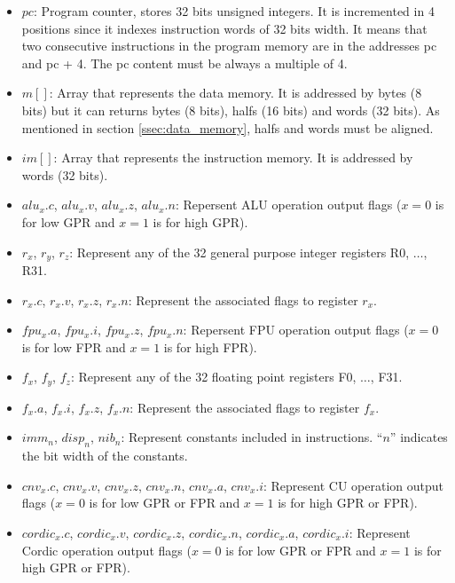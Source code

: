 \begin{itemize}
\item $pc$: Program counter, stores 32 bits unsigned integers. It is incremented in 4 positions since
      it indexes instruction words of 32 bits width. It means that two consecutive instructions in the program memory are in the addresses
      pc and pc + 4. The pc content must be always a multiple of 4.
\item $m[]$: Array that represents the data memory. It is addressed by bytes (8 bits) but it can
      returns bytes (8 bits), halfs (16 bits) and words (32 bits). As mentioned in section \ref{ssec:data_memory}, halfs and words must be
      aligned.
\item $im[]$: Array that represents the instruction memory. It is addressed by words (32 bits).
\item $alu_{x}.c$, $alu_{x}.v$, $alu_{x}.z$, $alu_{x}.n$: Repersent ALU operation output flags ($x=0$ is for low GPR and $x=1$ is for high GPR).
\item $r_{x}$, $r_{y}$, $r_{z}$: Represent any of the 32 general purpose integer registers R0, $\dots$, R31.
\item $r_{x}.c$, $r_{x}.v$, $r_{x}.z$, $r_{x}.n$: Represent the associated flags to register $r_{x}$.
\item $fpu_{x}.a$, $fpu_{x}.i$, $fpu_{x}.z$, $fpu_{x}.n$: Repersent FPU operation output flags ($x=0$ is for low FPR and $x=1$ is for high FPR).
\item $f_{x}$, $f_{y}$, $f_{z}$: Represent any of the 32 floating point registers F0, $\dots$, F31.
\item $f_{x}.a$, $f_{x}.i$, $f_{x}.z$, $f_{x}.n$: Represent the associated flags to register $f_{x}$.
\item $imm_{n}$, $disp_{n}$, $nib_{n}$: Represent constants included in instructions. ``$n$'' indicates the bit width of
      the constants.%
\item $cnv_{x}.c$, $cnv_{x}.v$, $cnv_{x}.z$, $cnv_{x}.n$, $cnv_{x}.a$, $cnv_{x}.i$: Represent CU operation output flags ($x=0$ is for low GPR or FPR
      and $x=1$ is for high GPR or FPR).
\item $cordic_{x}.c$, $cordic_{x}.v$, $cordic_{x}.z$, $cordic_{x}.n$, $cordic_{x}.a$, $cordic_{x}.i$: Represent Cordic operation output flags
      ($x=0$ is for low GPR or FPR and $x=1$ is for high GPR or FPR).
\end{itemize}

